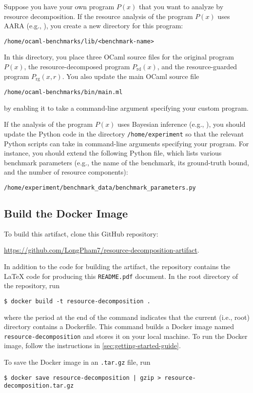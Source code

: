 Suppose you have your own program $P(x)$ that you want to analyze by resource
decomposition.
%
If the resource analysis of the program $P(x)$ uses AARA (e.g.,
), you create
a new directory for this program:
\begin{verbatim}
/home/ocaml-benchmarks/lib/<benchmark-name>
\end{verbatim}
%
In this directory, you place three OCaml source files for the original program
$P(x)$, the resource-decomposed program $P_{\mathrm{rd}}(x)$, and the
resource-guarded program $P_{\mathrm{rg}}(x, r)$.
%
You also update the main OCaml source file
\begin{verbatim}
/home/ocaml-benchmarks/bin/main.ml
\end{verbatim}
by enabling it to take a command-line argument specifying your custom program.

If the analysis of the program $P(x)$ uses Bayesian inference (e.g.,
), you
should update the Python code in the directory \texttt{/home/experiment}
so that the relevant Python scripts can take in command-line arguments
specifying your program.
%
For instance, you should extend the following Python file, which lists various
benchmark parameters (e.g., the name of the benchmark, its ground-truth bound,
and the number of resource components):
\begin{verbatim}
/home/experiment/benchmark_data/benchmark_parameters.py
\end{verbatim}

\subsection{Build the Docker Image}

To build this artifact, clone this GitHub repository:
\begin{center}
  \url{https://github.com/LongPham7/resource-decomposition-artifact}.
\end{center}
%
In addition to the code for building the artifact, the repository contains the
\LaTeX{} code for producing this \texttt{README.pdf} document.
%
In the root directory of the repository, run
\begin{verbatim}
$ docker build -t resource-decomposition .
\end{verbatim}
where the period at the end of the command indicates that the current (i.e.,
root) directory contains a Dockerfile.
%
This command builds a Docker image named \texttt{resource-decomposition} and
stores it on your local machine.
%
To run the Docker image, follow the instructions in
\cref{sec:getting-started-guide}.

To save the Docker image in an \texttt{.tar.gz} file, run
\begin{verbatim}
$ docker save resource-decomposition | gzip > resource-decomposition.tar.gz
\end{verbatim}

